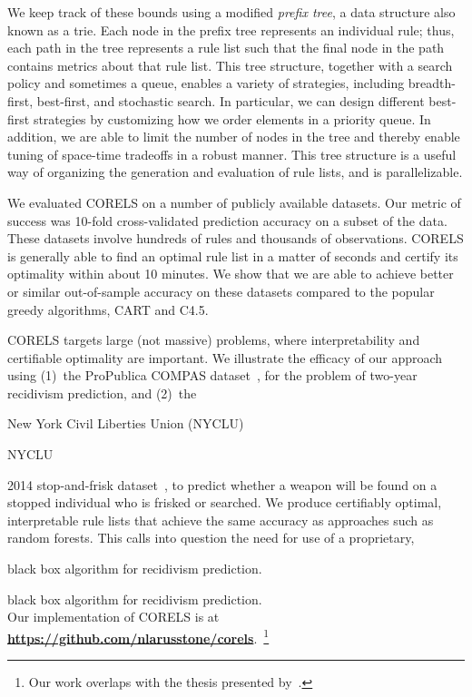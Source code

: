 We keep track of these bounds using a modified \emph{prefix tree},
a data structure also known as a trie.
%
Each node in the prefix tree represents an individual rule;
thus, each path in the tree represents a rule list such that
the final node in the path contains metrics about that rule list.
%
This tree structure, together with a search policy and sometimes a queue,
enables a variety of strategies, including breadth-first,
best-first, and stochastic search.
%
In particular, we can design different best-first strategies
by customizing how we order elements in a priority queue.
%
In addition, we are able to limit the number of nodes in the tree
and thereby enable tuning of space-time tradeoffs in a robust manner.
%
This tree structure is a useful way of organizing the generation
and evaluation of rule lists, and is parallelizable.

\begin{arxiv}
We evaluated CORELS on a number of publicly available datasets.
%
Our metric of success was 10-fold cross-validated prediction accuracy on a subset of the data.
%
These datasets involve hundreds of rules and thousands of observations.
%
CORELS is generally able to find an optimal rule list in a matter of seconds
and certify its optimality within about 10 minutes.
%
We show that we are able to achieve better or similar out-of-sample accuracy on these
datasets compared to the popular greedy algorithms, CART and C4.5.
\end{arxiv}

CORELS targets large (not massive) problems,
where interpretability and certifiable optimality are important.
%
We illustrate the efficacy of our approach using (1)~the ProPublica COMPAS dataset~\citep{LarsonMaKiAn16}, for the problem of two-year recidivism prediction,
and (2)~the
\begin{kdd}
New York Civil Liberties Union (NYCLU)
\end{kdd}
\begin{arxiv}
NYCLU
\end{arxiv}
2014 stop-and-frisk dataset~\citep{nyclu:2014}, to predict whether a weapon will be found
on a stopped individual who is frisked or searched.
%
We produce certifiably optimal, interpretable rule lists that achieve
the same accuracy as approaches such as random forests.
%
This calls into question the need for use of a proprietary,
\begin{kdd}
black box algorithm for recidivism prediction.
\end{kdd}
\begin{arxiv}
black box algorithm for recidivism prediction. \\

Our implementation of CORELS is at
\textbf{\url{https://github.com/nlarusstone/corels}}.~\footnote{Our work
overlaps with the thesis presented by~\citet{Larus-Stone17}.}
\end{arxiv}
